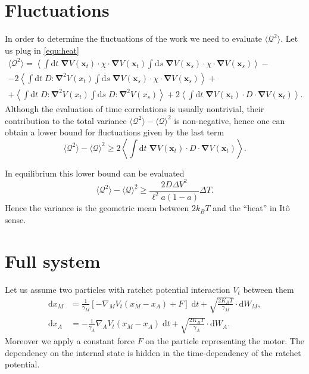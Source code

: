 \documentclass[11pt]{article}
\newcommand{\rmd}{{\mathrm d}}
\renewcommand{\vec}[1]{{\boldsymbol {#1}}}
\begin{document}
\section{Fluctuations} 
In order to determine the fluctuations of the work we need to evaluate $\langle {\mathcal Q}^2 \rangle$. 
Let us plug in \eqref{equ:heat} 
\begin{multline*}
\langle {\mathcal Q}^2 \rangle = \left\langle 
\int \rmd t \; \vec{\nabla} V(\vec{x}_t) \cdot \chi \cdot \vec{\nabla} V(\vec{x}_t)
\int \rmd s \; \vec{\nabla} V(\vec{x}_s) \cdot \chi \cdot \vec{\nabla} V(\vec{x}_s) 
\right\rangle - \\
- 2 \left\langle  
\int \rmd t \; D : \vec{\nabla}^2 V(x_t) 
\int \rmd s \; \vec{\nabla} V(\vec{x}_s) \cdot \chi \cdot \vec{\nabla} V(\vec{x}_s)  
\right\rangle + \\ 
+ \left\langle
\int \rmd t \; D : \vec{\nabla}^2 V(x_t) 
\int \rmd s \; D : \vec{\nabla}^2 V(x_s) 
\right\rangle
+ 2 \left\langle
\int \rmd t \; \vec{\nabla} V(\vec{x}_t) \cdot D \cdot \vec{\nabla} V(\vec{x}_t)
\right\rangle .
\end{multline*}
Although the evaluation of time correlations is usually nontrivial, 
their contribution to the total variance $\langle {\mathcal Q}^2 \rangle - \langle {\mathcal Q} \rangle^2$ is non-negative, hence one can obtain a lower bound for fluctuations given by the last term 
\[
\langle {\mathcal Q}^2 \rangle - \langle {\mathcal Q} \rangle^2 
\ge 
2 \left\langle
\int \rmd t \; \vec{\nabla} V(\vec{x}_t) \cdot D \cdot \vec{\nabla} V(\vec{x}_t)
\right\rangle .
\]

In equilibrium this lower bound can be evaluated 
\[
\langle {\mathcal Q}^2 \rangle - \langle {\mathcal Q} \rangle^2 
\ge 
\frac{ 2 D \Delta V^2 }{\ell^2 a (1-a) } \Delta T. 
\]
Hence the variance is the geometric mean between $2 k_B T$ and the ``heat'' in It\^{o} sense. 

\section{Full system}
Let us assume two particles with ratchet potential interaction $V_t$ between them
\begin{align*}
\rmd x_M &= \frac{1}{\gamma_M} \left[ - \nabla_M V_t(x_M - x_A ) + F \right] \; \rmd t + \sqrt{ \frac{2 K_B T}{\gamma_M} } \cdot \rmd W_M, \\
\rmd x_A &= - \frac{1}{\gamma_A} \nabla_A V_t(x_M - x_A ) \; \rmd t + \sqrt{ \frac{2 K_B T}{\gamma_A} } \cdot \rmd W_A . 
\end{align*}
Moreover we apply a constant force $F$ on the particle representing the motor. 
The dependency on the internal state is hidden in the time-dependency of the ratchet potential. 
\end{document}
